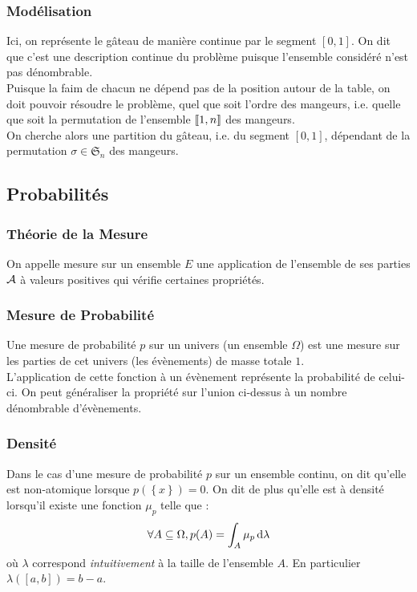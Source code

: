 \documentclass{beamercours}
\begin{document}
\begin{frame}
    \frametitle{Modélisation}
     {Ici, on représente le gâteau de manière continue par le segment $\left[0, 1\right]$. On dit que c'est une description continue du problème puisque l'ensemble considéré n'est pas dénombrable.\\}
     {Puisque la faim de chacun ne dépend pas de la position autour de la table, on doit pouvoir résoudre le problème, quel que soit l'ordre des mangeurs, i.e. quelle que soit la permutation de l'ensemble $\left\llbracket 1, n\right\rrbracket$ des mangeurs. \\}
     {On cherche alors une partition du gâteau, i.e. du segment $\left[0, 1\right]$, dépendant de la permutation $\sigma \in \mathfrak{S}_{n}$ des mangeurs.}
\end{frame}

\subsection{Probabilités}
\begin{frame}
    \frametitle{Théorie de la Mesure}
     {On appelle mesure sur un ensemble $E$ une application de l'ensemble de ses parties $\mathcal{A}$ à valeurs positives qui vérifie certaines propriétés. }
    

\end{frame}
\begin{frame}
    \frametitle{Mesure de Probabilité}
     {Une mesure de probabilité $p$ sur un univers (un ensemble $\Omega$) est une mesure sur les parties de cet univers (les évènements) de masse totale $1$.\\}
     {L'application de cette fonction à un évènement représente la probabilité de celui-ci. On peut généraliser la propriété sur l'union ci-dessus à un nombre dénombrable d'évènements. }
\end{frame}

\begin{frame}
    \frametitle{Densité}
     {Dans le cas d'une mesure de probabilité $p$ sur un ensemble continu, on dit qu'elle est non-atomique lorsque $p(\left\{x\right\}) = 0$.}
     {On dit de plus qu'elle est à densité lorsqu'il existe une fonction $\mu_{p}$ telle que : 
    \[
        \forall A \subseteq \Omega, p(A) = \int_{A} \mu_{p} {\, \rm d}\lambda
    \]
    où $\lambda$ correspond \textit{intuitivement} à la taille de l'ensemble $A$. En particulier $\lambda(\left[a, b\right]) = b - a$.}
\end{frame}
\end{document}
